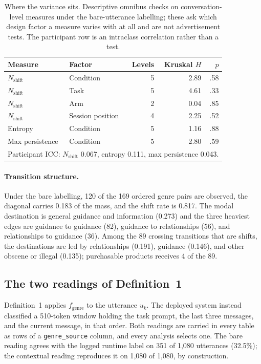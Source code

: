\begin{table}[H]
\centering
\caption{Where the variance sits. Descriptive omnibus checks on conversation-level measures under the bare-utterance labelling; these ask which design factor a measure varies with at all and are not advertisement tests. The participant row is an intraclass correlation rather than a test.}
\label{tab:app-traj-variance}
\begin{tabular}{llrrr}
\toprule
Measure & Factor & Levels & Kruskal \(H\) & \(p\) \\
\midrule
\(N_{\mathrm{shift}}\) & Condition        & 5 & 2.89 & .58 \\
\(N_{\mathrm{shift}}\) & Task             & 5 & 4.61 & .33 \\
\(N_{\mathrm{shift}}\) & Arm              & 2 & 0.04 & .85 \\
\(N_{\mathrm{shift}}\) & Session position & 4 & 2.25 & .52 \\
Entropy                & Condition        & 5 & 1.16 & .88 \\
Max persistence        & Condition        & 5 & 2.80 & .59 \\
\midrule
\multicolumn{5}{l}{Participant ICC: \(N_{\mathrm{shift}}\) 0.067, entropy 0.111, max persistence 0.043.} \\
\bottomrule
\end{tabular}
\end{table}

\paragraph{Transition structure.}
Under the bare labelling, 120 of the 169 ordered genre pairs are observed, the diagonal carries 0.183 of the mass, and the shift rate is 0.817. The modal destination is general guidance and information (0.273) and the three heaviest edges are guidance to guidance (82), guidance to relationships (56), and relationships to guidance (36). Among the 89 crossing transitions that are shifts, the destinations are led by relationships (0.191), guidance (0.146), and other obscene or illegal (0.135); purchasable products receives 4 of the 89.

\subsection{The two readings of Definition~1}
\label{sec:app-traj-labelling}

Definition~1 applies \(f_{\mathrm{genre}}\) to the utterance \(u_k\). The deployed system instead classified a 510-token window holding the task prompt, the last three messages, and the current message, in that order. Both readings are carried in every table as rows of a \texttt{genre\_source} column, and every analysis selects one. The bare reading agrees with the logged runtime label on 351 of 1{,}080 utterances (32.5\%); the contextual reading reproduces it on 1{,}080 of 1{,}080, by construction.

